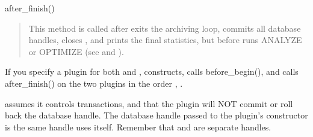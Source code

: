 \documentclass[letterpaper,10pt,english]{sphinxmanual}
\begin{document}
\sphinxAtStartPar
after\_finish()
\begin{quote}

\sphinxAtStartPar
This method is called after  exits the archiving loop, commits all
database handles, closes {\hyperref[\detokenize{mariadb-archiver:cmdoption-mariadb-archiver-file}]{}}, and prints the final statistics, but
before  runs ANALYZE or OPTIMIZE (see {\hyperref[\detokenize{mariadb-archiver:cmdoption-mariadb-archiver-analyze}]{}} and
{\hyperref[\detokenize{mariadb-archiver:cmdoption-mariadb-archiver-optimize}]{}}).
\end{quote}

\sphinxAtStartPar
If you specify a plugin for both {\hyperref[\detokenize{mariadb-archiver:cmdoption-mariadb-archiver-source}]{}} and {\hyperref[\detokenize{mariadb-archiver:cmdoption-mariadb-archiver-dest}]{}}, 
constructs, calls before\_begin(), and calls after\_finish() on the two plugins in
the order {\hyperref[\detokenize{mariadb-archiver:cmdoption-mariadb-archiver-source}]{}}, {\hyperref[\detokenize{mariadb-archiver:cmdoption-mariadb-archiver-dest}]{}}.

\sphinxAtStartPar
{} assumes it controls transactions, and that the plugin will NOT
commit or roll back the database handle.  The database handle passed to the
plugin’s constructor is the same handle  uses itself.  Remember
that {\hyperref[\detokenize{mariadb-archiver:cmdoption-mariadb-archiver-source}]{}} and {\hyperref[\detokenize{mariadb-archiver:cmdoption-mariadb-archiver-dest}]{}} are separate handles.
\end{document}
